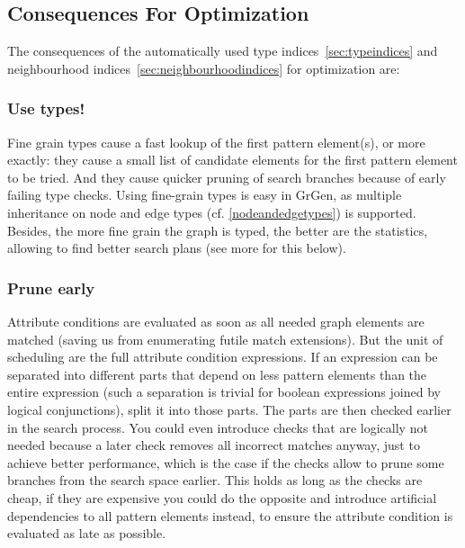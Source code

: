 \subsection{Consequences For Optimization}

The consequences of the automatically used type indices~\ref{sec:typeindices} and neighbourhood indices~\ref{sec:neighbourhoodindices} for optimization are:

\subsubsection*{Use types!}
Fine grain types cause a fast lookup of the first pattern element(s), or more exactly: they cause a small list of candidate elements for the first pattern element to be tried.
And they cause quicker pruning of search branches because of early failing type checks.
Using fine-grain types is easy in GrGen, as multiple inheritance on node and edge types (cf. \ref{nodeandedgetypes}) is supported.
Besides, the more fine grain the graph is typed, the better are the statistics, allowing \GrG{ } to find better search plans (see more for this below).

\subsubsection*{Prune early}
Attribute conditions are evaluated as soon as all needed graph elements are matched (saving us from enumerating futile match extensions).
But the unit of scheduling are the full attribute condition expressions. 
If an expression can be separated into different parts that depend on less pattern elements than the entire expression (such a separation is trivial for boolean expressions joined by logical conjunctions), split it into those parts.
The parts are then checked earlier in the search process.
You could even introduce checks that are logically not needed because a later check removes all incorrect matches anyway, just to achieve better performance, which is the case if the checks allow to prune some branches from the search space earlier.
This holds as long as the checks are cheap, if they are expensive you could do the opposite and introduce artificial dependencies to all pattern elements instead, to ensure the attribute condition is evaluated as late as possible.



